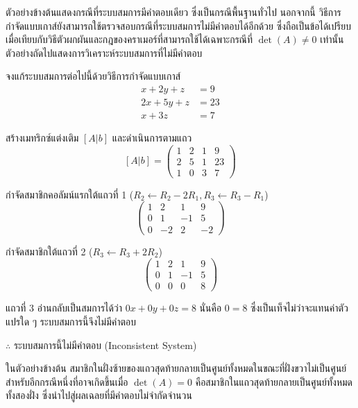 ตัวอย่างข้างต้นแสดงกรณีที่ระบบสมการมีคำตอบเดียว ซึ่งเป็นกรณีพื้นฐานทั่วไป นอกจากนี้ วิธีการกำจัดแบบเกาส์ยังสามารถใช้ตรวจสอบกรณีที่ระบบสมการไม่มีคำตอบได้อีกด้วย ซึ่งถือเป็นข้อได้เปรียบเมื่อเทียบกับวิธีตัวผกผันและกฎของคราเมอร์ที่สามารถใช้ได้เฉพาะกรณีที่ $\det(A) \neq 0$ เท่านั้น ตัวอย่างถัดไปแสดงการวิเคราะห์ระบบสมการที่ไม่มีคำตอบ

\begin{ex}
\label{ex:gauss-inconsistent}
จงแก้ระบบสมการต่อไปนี้ด้วยวิธีการกำจัดแบบเกาส์
\[
\begin{aligned}
x + 2y + z &= 9 \\
2x + 5y + z &= 23 \\
x + 3z &= 7
\end{aligned}
\]
\end{ex}
\begin{solution}
สร้างเมทริกซ์แต่งเติม $[A|b]$ และดำเนินการตามแถว \[ [A|b] = \left(\begin{array}{ccc|c} 1 & 2 & 1 & 9 \\ 2 & 5 & 1 & 23 \\ 1 & 0 & 3 & 7 \end{array}\right) \]

กำจัดสมาชิกคอลัมน์แรกใต้แถวที่ 1 ($R_2 \leftarrow R_2 - 2R_1, R_3 \leftarrow R_3 - R_1$) \[ \left(\begin{array}{ccc|c} 1 & 2 & 1 & 9 \\ 0 & 1 & -1 & 5 \\ 0 & -2 & 2 & -2 \end{array}\right) \]

กำจัดสมาชิกใต้แถวที่ 2 ($R_3 \leftarrow R_3 + 2R_2$) \[ \left(\begin{array}{ccc|c} 1 & 2 & 1 & 9 \\ 0 & 1 & -1 & 5 \\ 0 & 0 & 0 & 8 \end{array}\right) \]

แถวที่ 3 อ่านกลับเป็นสมการได้ว่า $0x + 0y + 0z = 8$ นั่นคือ $0 = 8$ ซึ่งเป็นเท็จไม่ว่าจะแทนค่าตัวแปรใด ๆ ระบบสมการนี้จึงไม่มีคำตอบ

$\therefore$ ระบบสมการนี้ไม่มีคำตอบ (Inconsistent System) \solhere
\end{solution}

ในตัวอย่างข้างต้น สมาชิกในฝั่งซ้ายของแถวสุดท้ายกลายเป็นศูนย์ทั้งหมดในขณะที่ฝั่งขวาไม่เป็นศูนย์ สำหรับอีกกรณีหนึ่งที่อาจเกิดขึ้นเมื่อ $\det(A) = 0$ คือสมาชิกในแถวสุดท้ายกลายเป็นศูนย์ทั้งหมดทั้งสองฝั่ง ซึ่งนำไปสู่ผลเฉลยที่มีคำตอบไม่จำกัดจำนวน

